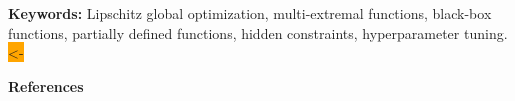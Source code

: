 \documentclass[a4paper,12pt,russian]{article}
\begin{document}
\begin{small}

\textbf{Keywords:} Lipschitz global optimization, multi-extremal functions, black-box functions, partially defined functions, hidden constraints, hyperparameter tuning.
\colorbox{orange}{<-}
\newline
\end{small}
\newline
{\large \textbf{References}}
\end{document}
